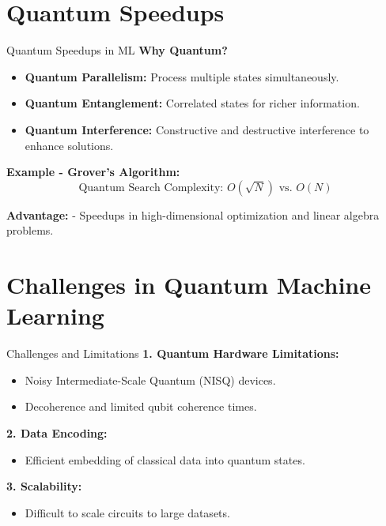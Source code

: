 \documentclass{beamer}
\begin{document}
\section{Quantum Speedups}
\begin{frame}{Quantum Speedups in ML}
\textbf{Why Quantum?}
\begin{itemize}
    \item \textbf{Quantum Parallelism:} Process multiple states simultaneously.
    \item \textbf{Quantum Entanglement:} Correlated states for richer information.
    \item \textbf{Quantum Interference:} Constructive and destructive interference to enhance solutions.
\end{itemize}

\textbf{Example - Grover's Algorithm:}
\[
\text{Quantum Search Complexity: } O(\sqrt{N}) \text{ vs. } O(N)
\]

\textbf{Advantage:}
- Speedups in high-dimensional optimization and linear algebra problems.
\end{frame}

\section{Challenges in Quantum Machine Learning}
\begin{frame}{Challenges and Limitations}
\textbf{1. Quantum Hardware Limitations:}
\begin{itemize}
    \item Noisy Intermediate-Scale Quantum (NISQ) devices.
    \item Decoherence and limited qubit coherence times.
\end{itemize}

\textbf{2. Data Encoding:}
\begin{itemize}
    \item Efficient embedding of classical data into quantum states.
\end{itemize}

\textbf{3. Scalability:}
\begin{itemize}
    \item Difficult to scale circuits to large datasets.
\end{itemize}
\end{frame}
\end{document}
